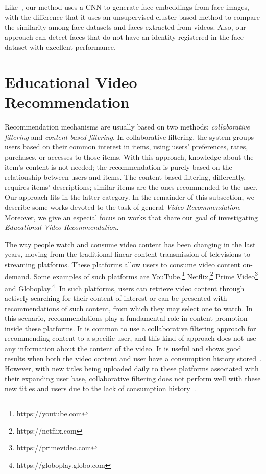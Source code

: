 Like~\cite{globofacestream, yang2017neural, rao2017attention, sohn2017unsupervised}, our method uses a CNN to generate face embeddings from face images, with the difference that it uses an unsupervised cluster-based method to compare the similarity among face datasets and faces extracted from videos. Also, our approach can detect faces that do not have an identity registered in the face dataset with excellent performance.

\section{Educational Video Recommendation}
\label{sec:recommendation}

Recommendation mechanisms are usually based on two methods: \textit{collaborative filtering} and \textit{content-based filtering}. 
In collaborative filtering, the system groups users based on their common interest in items, using users' preferences, rates, purchases, or accesses to those items. With this approach, 
knowledge about the item's content is not needed; the recommendation is purely based on the relationship between users and items.  The content-based filtering, differently, requires items' descriptions; similar items are the ones recommended to the user. Our approach fits in the latter category. In the remainder of this subsection, we describe some works devoted to the task of general \emph{Video Recommendation}. Moreover, we give an especial focus on works that share our goal of investigating \emph{Educational Video Recommendation}.

The way people watch and consume video content has been changing in the last years, moving from the traditional linear content transmission of televisions to streaming platforms. These platforms allow users to consume video content on-demand. Some examples of such platforms are YouTube,\footnote{https://youtube.com} Netflix,\footnote{https://netflix.com} Prime Video\footnote{https://primevideo.com} and Globoplay.\footnote{https://globoplay.globo.com}. In such platforms, users can retrieve video content through actively searching for their content of interest or can be presented with recommendations of such content, from which they may select one to watch. 
In this scenario, recommendations play a fundamental role in content promotion inside these platforms. It is common to use a collaborative filtering approach for recommending content to a specific user, and this kind of approach does not use any information about the content of the video. It is useful and shows good results when both the video content and user have a consumption history stored~\cite{ferreira2020investigating}. 
However, with new titles being uploaded daily to these platforms associated with their expanding user base, collaborative filtering does not perform well with these new titles and users due to the lack of consumption history~\cite{suvash14social}. 

